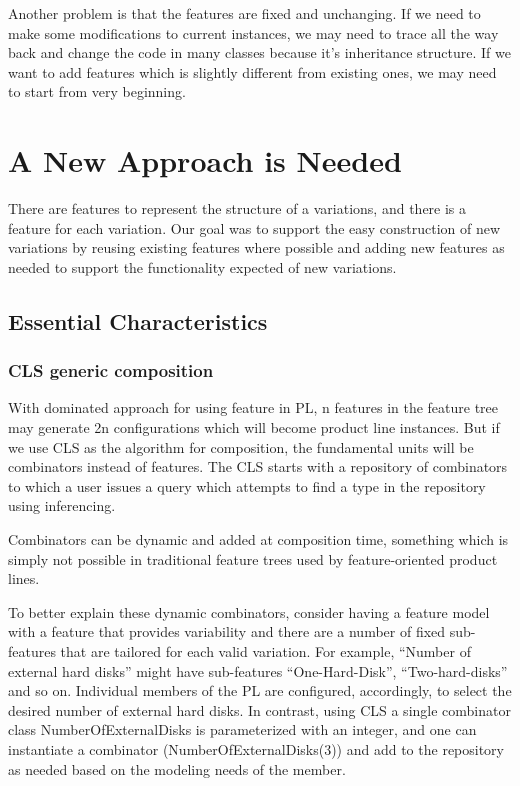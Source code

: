 \documentclass[sigconf]{acmart}
\begin{document}
 Another problem is that the features are fixed and unchanging. If we need to make some modifications to current
 instances, we may need to trace all the way back and change the code in many classes because it’s inheritance
 structure. If we want to add features which is slightly different from existing ones, we may need to start from
 very beginning.

\section{A New Approach is Needed}

There are features to represent the structure of a variations, and there is a feature for each variation.
Our goal was to support the easy construction of new variations by reusing existing features where possible
and adding new features as needed to support the functionality expected of new variations.


\subsection{Essential Characteristics}

\subsubsection{CLS generic composition}

With dominated approach for using feature in PL, n features in the feature tree may generate 2n configurations
 which will become product line instances. But if we use CLS as the algorithm for composition, the fundamental
 units will be combinators instead of features. The CLS starts with a repository of combinators to which a user
 issues a query which attempts to find a type in the repository using inferencing.

Combinators can be dynamic and added at composition time, something which is simply not possible in traditional
feature trees used by feature-oriented product lines.

To better explain these dynamic combinators, consider having a feature model with a feature that provides
variability and there are a number of fixed sub-features that are tailored for each valid variation.
For example, “Number of external hard disks” might have sub-features “One-Hard-Disk”, “Two-hard-disks” and
so on. Individual members of the PL are configured, accordingly, to select the desired number of external hard
disks. In contrast, using CLS a single combinator class NumberOfExternalDisks is parameterized with an integer,
and one can instantiate a combinator (NumberOfExternalDisks(3)) and add to the repository as needed based on
the modeling needs of the member.
\end{document}
